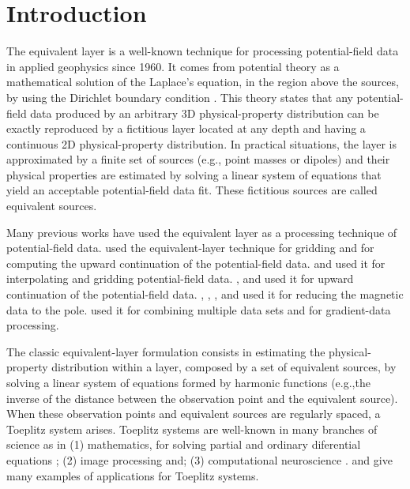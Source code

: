 \documentclass[manuscript,revised]{geophysics}
\begin{document}
\section{Introduction}


The equivalent layer is a well-known technique for processing potential-field data in applied geophysics since 1960. It comes from potential theory as a mathematical solution of the Laplace's equation, in the region above the sources, by using the Dirichlet boundary condition \citep{kellogg1929}.
This theory states that any potential-field data produced by an arbitrary 3D physical-property distribution can be exactly reproduced by a fictitious layer located at any depth and having a continuous 2D physical-property  distribution. In practical situations, the layer is approximated by a finite set of sources (e.g., point masses or dipoles) and their physical properties are estimated by solving a linear system of equations that yield an acceptable potential-field data fit. These fictitious sources are called equivalent sources.

Many previous works have used the equivalent layer as a processing technique of potential-field data. \citet{dampney1969} used the equivalent-layer technique for gridding and for computing the upward continuation of the potential-field data. \citet{cordell1992} and \citet{mendonca-silva1994} used it for interpolating and gridding potential-field data. \citet{emilia1973}, \citet{hansen-miyazaki1984} and \citet{li-oldenburg2010} used it for upward continuation of the potential-field data. \citet{silva1986}, \citet{leao-silva1989}, \citet{guspi-novara2009}, and \citet{oliveirajr-etal2013} used it for reducing the magnetic data to the pole. \citet{boggs-dransfield2004} used it for combining multiple data sets and \citet{barnes-lumley2011} for gradient-data processing.

The classic equivalent-layer formulation consists in estimating the physical-property distribution within a layer, composed by a set of equivalent sources, by solving a linear system of equations formed by harmonic functions (e.g.,the inverse of the distance between the observation point and the equivalent source). When these observation points and equivalent sources are regularly spaced, a Toeplitz system arises. Toeplitz systems are well-known in many branches of science as in (1) mathematics, for solving partial and ordinary diferential equations \citep[e.g.,][]{lin-etal2003}; (2) image processing \citep[e.g.,][]{chan-etal1999} and; (3) computational neuroscience \citep[e.g.,][]{wray-green1994}. \citet{jin2003} and \citet{chan-jin2007} give many examples of applications for Toeplitz systems.
\end{document}
